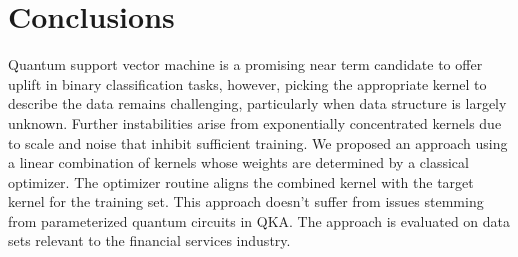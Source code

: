 \documentclass[reprint,amsfonts, amssymb, amsmath,  showkeys, nofootinbib,pra, superscriptaddress, twocolumn,longbibliography]{revtex4-2}
\begin{document}



\section{Conclusions}

Quantum support vector machine is a promising near term candidate to offer uplift in binary classification tasks, however, picking the appropriate kernel to describe the data remains challenging, particularly when data structure is largely unknown. Further instabilities arise from exponentially concentrated kernels due to scale and noise that inhibit sufficient training. We proposed an approach using a linear combination of kernels whose weights are determined by a classical optimizer. The optimizer routine aligns the combined kernel with the target kernel for the training set. This approach doesn't suffer from issues stemming from parameterized quantum circuits in QKA. The approach is evaluated on data sets relevant to the financial services industry.
\end{document}
